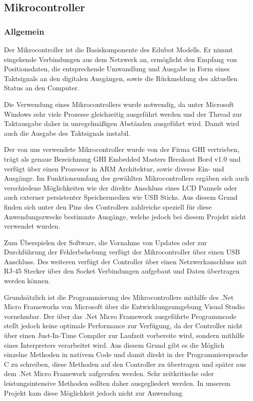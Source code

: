 \subsection{Mikrocontroller}
\subsubsection{Allgemein}

Der Mikrocontroller ist die Basiskomponente des Edubot Modells. Er nimmt eingehende Verbindungen aus dem Netzwerk an, ermöglicht den Empfang von Positionsdaten, die entsprechende Umwandlung und Ausgabe in Form eines Taktsignals an den digitalen Ausgängen, sowie die Rückmeldung des aktuellen Status an den Computer.

Die Verwendung eines Mikrocontrollers wurde notwendig, da unter Microsoft Windows sehr viele Prozesse gleichzeitig ausgeführt werden und der Thread zur Taktausgabe daher in unregelmäßigen Abständen ausgeführt wird. Damit wird auch die Ausgabe des Taktsignals instabil.

Der von uns verwendete Mikrocontroller wurde von der Firma GHI vertrieben, trägt als genaue Bezeichnung GHI Embedded Masters Breakout Bord v1.0 und verfügt über einen Prozessor in ARM Architektur, sowie diverse Ein- und Ausgänge. Im Funktionsumfang des gewählten Mikrocontrollers ergäben sich auch verschiedene Möglichkeiten wie der direkte Anschluss eines LCD Pannels oder auch externer persistenter Speichermedien wie USB Sticks. Aus diesem Grund finden sich unter den Pins des Controllers zahlreiche speziell für diese Anwendungszwecke bestimmte Ausgänge, welche jedoch bei diesem Projekt nicht verwendet wurden.

Zum Überspielen der Software, die Vornahme von Updates oder zur Durchführung der Fehlerbehebung verfügt der Mikrocontroller über einen USB Anschluss. Des weiteren verfügt der Controller über einen Netzwerkanschluss mit RJ-45 Stecker über den Socket Verbindungen aufgebaut und Daten übertragen werden können.

Grundsätzlich ist die Programmierung des Mikrocontrollers mithilfe des .Net Micro Frameworks von Microsoft über die Entwicklungsumgebung Visual Studio vornehmbar. Der über das .Net Micro Framework ausgeführte Programmcode stellt jedoch keine optimale Performance zur Verfügung, da der Controller nicht über einen Just-In-Time Compiler zur Laufzeit vorbereite wird, sondern mithilfe eines Interpreters verarbeitet wird. Aus diesem Grund gibt es die Möglich einzelne Methoden in nativem Code und damit direkt in der Programmiersprache C zu schreiben, diese Methoden auf den Controller zu übertragen und später aus dem .Net Micro Framework aufgerufen werden. Sehr zeitkritische oder leistungsintensive Methoden sollten daher ausgegliedert werden. In unserem Projekt kam diese Möglichkeit jedoch nicht zur Anwendung

